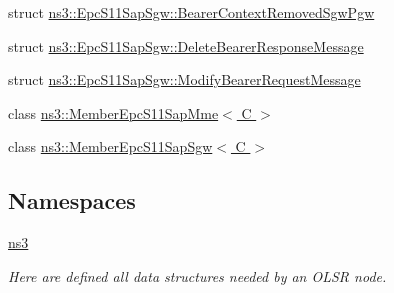 \begin{DoxyCompactItemize}
\item 
struct \hyperlink{structns3_1_1EpcS11SapSgw_1_1BearerContextRemovedSgwPgw}{ns3\+::\+Epc\+S11\+Sap\+Sgw\+::\+Bearer\+Context\+Removed\+Sgw\+Pgw}
\item 
struct \hyperlink{structns3_1_1EpcS11SapSgw_1_1DeleteBearerResponseMessage}{ns3\+::\+Epc\+S11\+Sap\+Sgw\+::\+Delete\+Bearer\+Response\+Message}
\item 
struct \hyperlink{structns3_1_1EpcS11SapSgw_1_1ModifyBearerRequestMessage}{ns3\+::\+Epc\+S11\+Sap\+Sgw\+::\+Modify\+Bearer\+Request\+Message}
\item 
class \hyperlink{classns3_1_1MemberEpcS11SapMme}{ns3\+::\+Member\+Epc\+S11\+Sap\+Mme$<$ C $>$}
\item 
class \hyperlink{classns3_1_1MemberEpcS11SapSgw}{ns3\+::\+Member\+Epc\+S11\+Sap\+Sgw$<$ C $>$}
\end{DoxyCompactItemize}
\subsection*{Namespaces}
\begin{DoxyCompactItemize}
\item 
 \hyperlink{namespacens3}{ns3}
\begin{DoxyCompactList}\small\item\em Here are defined all data structures needed by an O\+L\+SR node. \end{DoxyCompactList}\end{DoxyCompactItemize}
